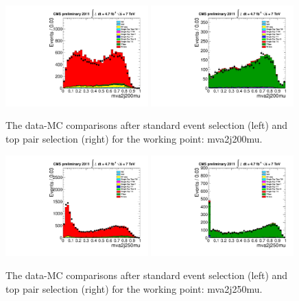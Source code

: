 \begin{figure}[!t]
  \centering
  \includegraphics[width=0.49\textwidth]{figs/cl-mva2j200mu-normal.pdf}
  \includegraphics[width=0.49\textwidth]{figs/cl-mva2j200mu-inTTbar.pdf}
  \caption{\label{fig:mva:plots-mva2j200mu} The data-MC comparisons
    after standard event selection (left) and top pair
    selection (right) for the working point: mva2j200mu.}
\end{figure}

\begin{figure}[!t]
  \centering
  \includegraphics[width=0.49\textwidth]{figs/cl-mva2j250mu-normal.pdf}
  \includegraphics[width=0.49\textwidth]{figs/cl-mva2j250mu-inTTbar.pdf}
  \caption{\label{fig:mva:plots-mva2j250mu} The data-MC comparisons
    after standard event selection (left) and top pair
    selection (right) for the working point: mva2j250mu.}
\end{figure}

